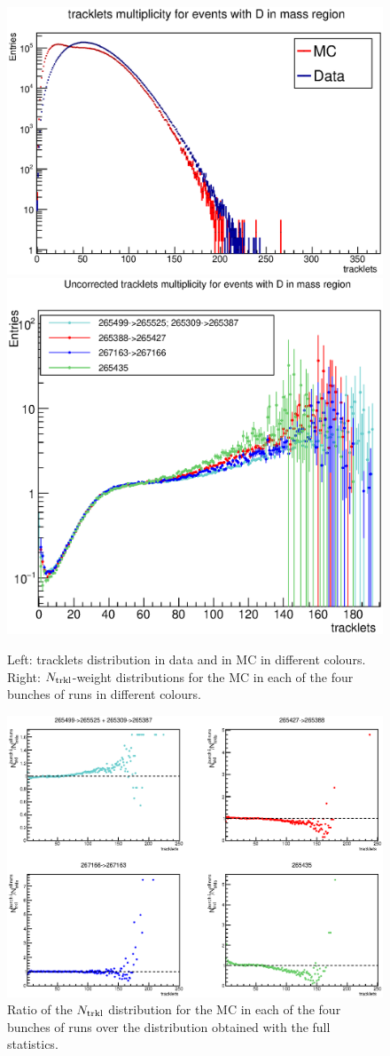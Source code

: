 \begin{figure}[h]
\centering
 \includegraphics[width=.49\textwidth]{FigCap6/NtrkDistrWithDDataMC.eps}
 \includegraphics[width=.43\textwidth]{FigCap6/NtrklWeights4Bunches.eps}
 \caption{Left: tracklets distribution in data and in MC in different colours. Right: $N_{\rm trkl}$-weight distributions for the MC in each of the four bunches of runs in different colours.}
 \label{fig:NtrklDataMC}
\end{figure}

\begin{figure}[h]
\centering
 \includegraphics[width=.85\textwidth]{FigCap6/NtrkDistrMC_17d2a_EvWithD_zVxtUnCorr_896_897.eps}
 \caption{Ratio of the $N_{\rm trkl}$ distribution for the MC in each of the four bunches of runs over the distribution obtained with the full statistics.}
 \label{fig:RatioNtrklMC}
\end{figure}

